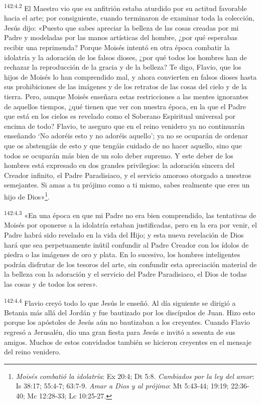 \par
\textsuperscript{142:4.2} El Maestro vio que su anfitrión estaba aturdido por su actitud favorable hacia el arte; por consiguiente, cuando terminaron de examinar toda la colección, Jesús dijo: «Puesto que sabes apreciar la belleza de las cosas creadas por mi Padre y modeladas por las manos artísticas del hombre, ¿por qué esperabas recibir una reprimenda? Porque Moisés intentó en otra época combatir la idolatría y la adoración de los falsos dioses, ¿por qué todos los hombres han de rechazar la reproducción de la gracia y de la belleza? Te digo, Flavio, que los hijos de Moisés lo han comprendido mal, y ahora convierten en falsos dioses hasta sus prohibiciones de las imágenes y de los retratos de las cosas del cielo y de la tierra. Pero, aunque Moisés enseñara estas restricciones a las mentes ignorantes de aquellos tiempos, ¿qué tienen que ver con nuestra época, en la que el Padre que está en los cielos es revelado como el Soberano Espiritual universal por encima de todo? Flavio, te aseguro que en el reino venidero ya no continuarán enseñando `No adoréis esto y no adoréis aquello'; ya no se ocuparán de ordenar que os abstengáis de esto y que tengáis cuidado de no hacer aquello, sino que todos se ocuparán más bien de un solo deber supremo. Y este deber de los hombres está expresado en dos grandes privilegios: la adoración sincera del Creador infinito, el Padre Paradisiaco, y el servicio amoroso otorgado a nuestros semejantes. Si amas a tu prójimo como a ti mismo, sabes realmente que eres un hijo de Dios»\footnote{\textit{Moisés combatió la idolatría}: Ex 20:4; Dt 5:8. \textit{Cambiados por la ley del amor}: Is 38:17; 55:4-7; 63:7-9. \textit{Amar a Dios y al prójimo}: Mt 5:43-44; 19:19; 22:36-40; Mc 12:28-33; Lc 10:25-27.}.

\par
\textsuperscript{142:4.3} «En una época en que mi Padre no era bien comprendido, las tentativas de Moisés por oponerse a la idolatría estaban justificadas, pero en la era por venir, el Padre habrá sido revelado en la vida del Hijo; y esta nueva revelación de Dios hará que sea perpetuamente inútil confundir al Padre Creador con los ídolos de piedra o las imágenes de oro y plata. En lo sucesivo, los hombres inteligentes podrán disfrutar de los tesoros del arte, sin confundir esta apreciación material de la belleza con la adoración y el servicio del Padre Paradisiaco, el Dios de todas las cosas y de todos los seres».

\par
\textsuperscript{142:4.4} Flavio creyó todo lo que Jesús le enseñó. Al día siguiente se dirigió a Betania más allá del Jordán y fue bautizado por los discípulos de Juan. Hizo esto porque los apóstoles de Jesús aún no bautizaban a los creyentes. Cuando Flavio regresó a Jerusalén, dio una gran fiesta para Jesús e invitó a sesenta de sus amigos. Muchos de estos convidados también se hicieron creyentes en el mensaje del reino venidero.

